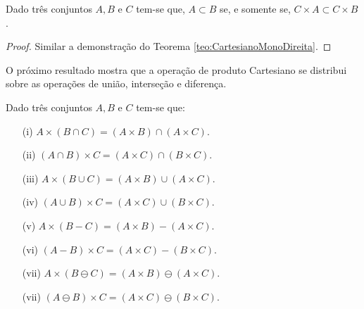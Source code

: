 \begin{teorema}
	Dado três conjuntos $A, B$ e $C$ tem-se que, $A \subset B$ se, e somente se, $C \times A \subset C \times B$.
\end{teorema}

\begin{proof}
	Similar a demonstração do Teorema \ref{teo:CartesianoMonoDireita}.
\end{proof}

O próximo resultado mostra que a operação de produto Cartesiano se distribui sobre as operações de união, interseção e diferença.

\begin{teorema}\label{teo:DistributividadeCartesiano}
	Dado três conjuntos $A, B$ e $C$ tem-se que:
	\begin{itemize}
		\item[(i)] $A \times (B \cap C) = (A \times B) \cap (A \times C)$.
		\item[(ii)] $(A \cap B) \times C = (A \times C) \cap (B \times C)$.
		\item[(iii)] $A \times (B \cup C) = (A \times B) \cup (A \times C)$.
		\item[(iv)] $(A \cup B) \times C = (A \times C) \cup (B \times C)$.
		\item[(v)] $A \times (B - C) = (A \times B) - (A \times C)$.
		\item[(vi)] $(A - B) \times C = (A \times C) - (B \times C)$.
		\item[(vii)] $A \times (B \ominus C) = (A \times B) \ominus (A \times C)$.
		\item[(vii)] $(A \ominus B) \times C = (A \times C) \ominus (B \times C)$.
	\end{itemize}
\end{teorema}

